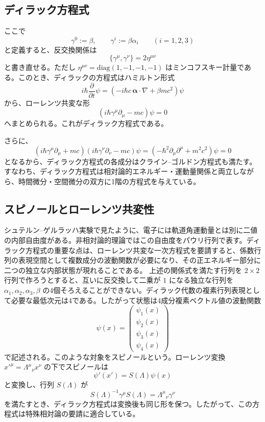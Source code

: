 \subsection{ディラック方程式}
ここで
\[
\gamma^0 := \beta,
\qquad
\gamma^i := \beta\alpha_i
\qquad (i=1,2,3)
\]
と定義すると、反交換関係は
\[
\{\gamma^\mu,\gamma^\nu\}=2\eta^{\mu\nu}
\]
と書き直せる。ただし $\eta^{\mu\nu}=\mathrm{diag}(1,-1,-1,-1)$ はミンコフスキー計量である。このとき、ディラックの方程式はハミルトン形式
\[
i\hbar \frac{\partial}{\partial t}\psi
=
\left(
-i\hbar c\,\boldsymbol{\alpha}\cdot \nabla + \beta mc^2
\right)\psi
\]
から、ローレンツ共変な形
\[
\left(i\hbar \gamma^\mu \partial_\mu - mc\right)\psi = 0
\]
へまとめられる。これがディラック方程式である。

さらに、
\[
\left(i\hbar \gamma^\mu \partial_\mu + mc\right)
\left(i\hbar \gamma^\nu \partial_\nu - mc\right)\psi
=
\left(-\hbar^2\partial_\mu\partial^\mu + m^2c^2\right)\psi
=0
\]
となるから、ディラック方程式の各成分はクライン--ゴルドン方程式も満たす。すなわち、ディラック方程式は相対論的エネルギー・運動量関係と両立しながら、時間微分・空間微分の双方に1階の方程式を与えている。

\subsection{スピノールとローレンツ共変性}
シュテルン--ゲルラッハ実験で見たように、電子には軌道角運動量とは別に二値の内部自由度がある。非相対論的理論ではこの自由度をパウリ行列で表す。ディラック方程式の重要な点は、ローレンツ共変な一次方程式を要請すると、係数行列の表現空間として複数成分の波動関数が必要になり、その正エネルギー部分に二つの独立な内部状態が現れることである。
上述の関係式を満たす行列を $2\times2$ 行列で作ろうとすると、互いに反交換して二乗が $1$ になる独立な行列を $\alpha_1,\alpha_2,\alpha_3,\beta$ の4個そろえることができない。ディラック代数の複素行列表現として必要な最低次元は4である。したがって状態は4成分複素ベクトル値の波動関数
\begin{equation}
    \psi(x) = \begin{pmatrix} \psi_1(x) \\ \psi_2(x) \\ \psi_3(x) \\ \psi_4(x) \end{pmatrix}
\end{equation}
で記述される。このような対象をスピノールという。ローレンツ変換 $x'^\mu=\Lambda^\mu{}_\nu x^\nu$ の下でスピノールは
\[
\psi'(x') = S(\Lambda)\psi(x)
\]
と変換し、行列 $S(\Lambda)$ が
\[
S(\Lambda)^{-1}\gamma^\mu S(\Lambda)
=
\Lambda^\mu{}_\nu \gamma^\nu
\]
を満たすとき、ディラック方程式は変換後も同じ形を保つ。したがって、この方程式は特殊相対論の要請に適合している。

